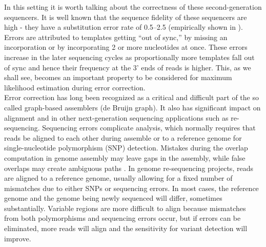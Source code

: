 \documentclass[11pt]{article}
\begin{document}
In this setting it is worth talking about the correctness of these second-generation sequencers. It is well known that the sequence fidelity of these sequencers are high - they have a substitution error rate of 0.5--2.5 (empirically shown in \cite{quake}). Errors are attributed to templates getting “out of sync,” by missing an incorporation or by incorporating 2 or more nucleotides at once. These errors increase in the later sequencing cycles as proportionally more templates fall out of sync and hence their frequency at the 3' ends of reads is higher. This, as we shall see, becomes an important property to be considered for maximum likelihood estimation during error correction.\\

Error correction has long been recognized as a critical and difficult part of the so called graph-based assemblers (de Bruijn graph). It also has significant impact on alignment and in other next-generation sequencing applications such as re-sequencing. Sequencing errors complicate analysis, which normally requires that reads be aligned to each other during assemble or to a reference genome for single-nucleotide polymorphism (SNP) detection. Mistakes during the overlap computation in genome assembly may leave gaps in the assembly, while false overlaps may create ambiguous paths \cite{quake}. In genome re-sequencing projects, reads are aligned to a reference genome, usually allowing for a fixed number of mismatches due to either SNPs or sequencing errors. In most cases, the reference genome and the genome being newly sequenced will differ, sometimes substantially. Variable regions are more difficult to align because mismatches from both polymorphisms and sequencing errors occur, but if errors can be eliminated, more reads will align and the sensitivity for variant detection will improve.
\end{document}
